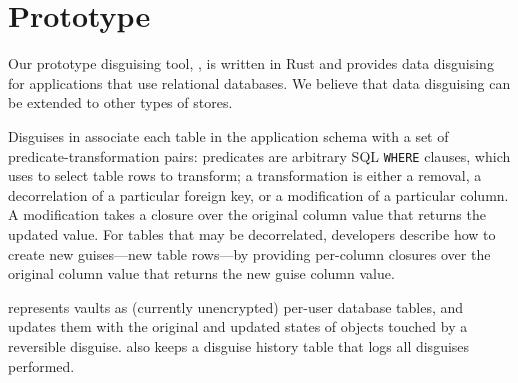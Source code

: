 \section{Prototype}
\label{sec:proto}
%
Our prototype disguising tool, \sys, is written in Rust and 
provides data disguising for applications that use relational databases.
%
We believe that data disguising can be extended to other types of stores.
%

Disguises in \sys associate each table in the application schema with a set of
predicate-transformation pairs: predicates are arbitrary SQL \texttt{WHERE} clauses, which \sys uses
to select table rows to transform; a transformation is either a removal, a decorrelation of a
particular foreign key, or a modification of a particular column. A modification takes a
closure over the original column value that returns the updated value.
%
For tables that may be decorrelated, developers describe how to create new guises---new table
rows---by providing per-column closures over the original column value
that returns the new guise column value.

%
\sys represents vaults as (currently unencrypted) per-user database tables, and updates them with
the original and updated states of objects touched by a reversible disguise. \sys also keeps a
disguise history table that logs all disguises performed. 

\iffalse
\sys also provides a specification of the end-state after it applies a sequence of
disguises; this allows developers to double-check that their disguises achieve their privacy
transformation goals.
%
To do so, \sys automatically generates a sequence of materialized view filters that, when applied on top of each
other, correspond to the state achieved by composing the disguises. 
Developers specify assertions (\eg all objects belonging to departing user Bob have
been removed) that \sys ensures holds on the materialized view specification.

\sys's composition technique may reorder filters from one disguise with those from a subsequent disguise in order to achieve the
correct result.
%
\sys maps these filters directly to physical database operations (where reordering filters corresponds to
temporarily undoing vault entries). Thus, the developer can use the materialized view filters as a way to
test the correctness of \sys and their disguises prior to permanently altering the application database. 
\fi
